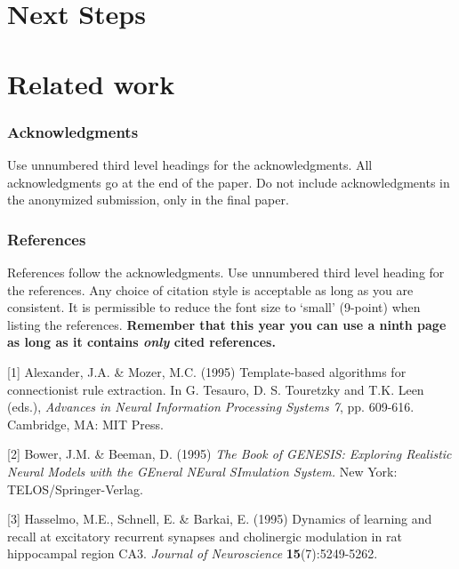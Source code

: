 \documentclass{article} %
\begin{document}
\section{Next Steps}

\section{Related work}

\subsubsection*{Acknowledgments}

Use unnumbered third level headings for the acknowledgments. All
acknowledgments go at the end of the paper. Do not include 
acknowledgments in the anonymized submission, only in the 
final paper. 

\subsubsection*{References}

References follow the acknowledgments. Use unnumbered third level heading for
the references. Any choice of citation style is acceptable as long as you are
consistent. It is permissible to reduce the font size to `small' (9-point) 
when listing the references. {\bf Remember that this year you can use
a ninth page as long as it contains \emph{only} cited references.}

\small{
[1] Alexander, J.A. \& Mozer, M.C. (1995) Template-based algorithms
for connectionist rule extraction. In G. Tesauro, D. S. Touretzky
and T.K. Leen (eds.), {\it Advances in Neural Information Processing
Systems 7}, pp. 609-616. Cambridge, MA: MIT Press.

[2] Bower, J.M. \& Beeman, D. (1995) {\it The Book of GENESIS: Exploring
Realistic Neural Models with the GEneral NEural SImulation System.}
New York: TELOS/Springer-Verlag.

[3] Hasselmo, M.E., Schnell, E. \& Barkai, E. (1995) Dynamics of learning
and recall at excitatory recurrent synapses and cholinergic modulation
in rat hippocampal region CA3. {\it Journal of Neuroscience}
{\bf 15}(7):5249-5262.
}
\end{document}
